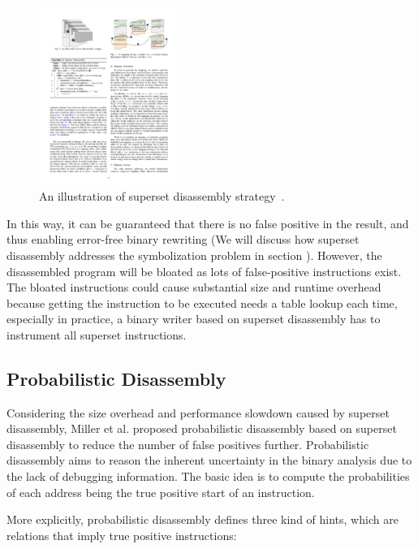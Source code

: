 \begin{figure}[tb]
  \centering
  \includegraphics[width=0.4\textwidth]{fig/Superset-Disassembly.pdf}
  \caption{An illustration of superset disassembly strategy~\cite{bauman2018superset}.}
  \label{fig:superset}
\end{figure}

In this way, it can be guaranteed that there is no false positive in the
result, and thus enabling error-free binary rewriting (We will discuss how
superset disassembly addresses the symbolization problem in section
). However, the disassembled program will be bloated as lots of
false-positive instructions exist. The bloated instructions could cause
substantial size and runtime overhead because getting the instruction to be
executed needs a table lookup each time, especially in practice, a binary writer based on superset disassembly has to instrument all superset instructions.

\subsection{Probabilistic Disassembly} \label{sec:existing-probabilistic}
Considering the size overhead and performance slowdown caused by superset
disassembly, Miller et al. proposed probabilistic disassembly based on superset
disassembly to reduce the number of false positives further. Probabilistic disassembly aims to reason the inherent uncertainty in the binary analysis due to the lack of debugging information. The basic idea is to compute the probabilities of each address being the true positive start of an instruction.

More explicitly, probabilistic disassembly defines three kind of hints, which are relations that imply true positive instructions:

